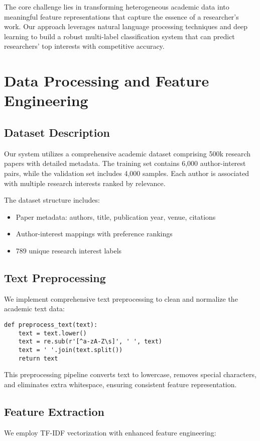 \documentclass[preprint,12pt]{elsarticle}
\begin{document}
The core challenge lies in transforming heterogeneous academic data into meaningful feature representations that capture the essence of a researcher's work.
Our approach leverages natural language processing techniques and deep learning to build a robust multi-label classification system that can predict researchers' top interests with competitive accuracy.

\section{Data Processing and Feature Engineering}
\label{sec2}

\subsection{Dataset Description}
Our system utilizes a comprehensive academic dataset comprising 500k research papers with detailed metadata.
The training set contains 6,000 author-interest pairs, while the validation set includes 4,000 samples. Each author is associated with multiple research interests ranked by relevance.

The dataset structure includes:
\begin{itemize}
    \item Paper metadata: authors, title, publication year, venue, citations
    \item Author-interest mappings with preference rankings
    \item 789 unique research interest labels
\end{itemize}

\subsection{Text Preprocessing}
We implement comprehensive text preprocessing to clean and normalize the academic text data:

\begin{verbatim}
def preprocess_text(text):
    text = text.lower()
    text = re.sub(r'[^a-zA-Z\s]', ' ', text)
    text = ' '.join(text.split())
    return text
\end{verbatim}

This preprocessing pipeline converts text to lowercase, removes special characters, and eliminates extra whitespace, ensuring consistent feature representation.

\subsection{Feature Extraction}
We employ TF-IDF vectorization with enhanced feature engineering:
\end{document}
